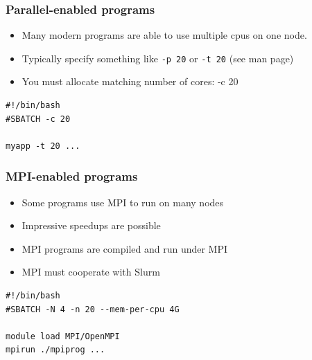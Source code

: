 \documentclass[10pt]{beamer}
\begin{document}
\begin{frame}[fragile]
\frametitle{Parallel-enabled programs}
\begin{itemize}
\item Many modern programs are able to use multiple cpus on one node.
\item Typically specify something like \verb+-p 20+ or \verb+-t 20+ (see man page)
\item You must allocate matching number of cores: -c 20
\end{itemize}

\begin{block}{}
\begin{verbatim}
#!/bin/bash
#SBATCH -c 20

myapp -t 20 ...
\end{verbatim}
\end{block}{}
\end{frame}

\begin{frame}[fragile]
\frametitle{MPI-enabled programs}
\begin{itemize}
\item Some programs use MPI to run on many nodes
\item Impressive speedups are possible
\item MPI programs are compiled and run under MPI
\item MPI must cooperate with Slurm
\end{itemize}

\begin{block}{}
\begin{verbatim}
#!/bin/bash
#SBATCH -N 4 -n 20 --mem-per-cpu 4G

module load MPI/OpenMPI
mpirun ./mpiprog ...
\end{verbatim}
\end{block}{}
\end{frame}
\end{document}
